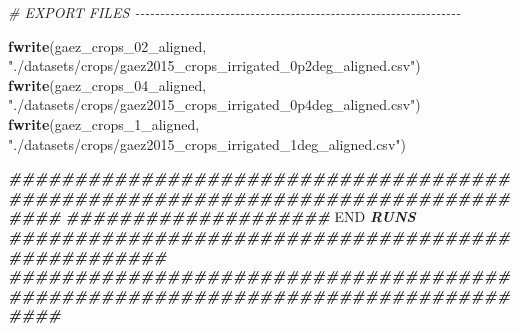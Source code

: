 \documentclass[
  11pt,
]{article}
\newenvironment{Shaded}{\begin{snugshade}}{\end{snugshade}}
\newcommand{\CommentTok}[1]{\textcolor[rgb]{0.56,0.35,0.01}{\textit{#1}}}
\newcommand{\DocumentationTok}[1]{\textcolor[rgb]{0.56,0.35,0.01}{\textbf{\textit{#1}}}}
\newcommand{\FunctionTok}[1]{\textcolor[rgb]{0.13,0.29,0.53}{\textbf{#1}}}
\newcommand{\NormalTok}[1]{#1}
\newcommand{\RegionMarkerTok}[1]{#1}
\newcommand{\StringTok}[1]{\textcolor[rgb]{0.31,0.60,0.02}{#1}}
\begin{document}
\begin{Shaded}
\begin{Highlighting}[]
\CommentTok{\# EXPORT FILES {-}{-}{-}{-}{-}{-}{-}{-}{-}{-}{-}{-}{-}{-}{-}{-}{-}{-}{-}{-}{-}{-}{-}{-}{-}{-}{-}{-}{-}{-}{-}{-}{-}{-}{-}{-}{-}{-}{-}{-}{-}{-}{-}{-}{-}{-}{-}{-}{-}{-}{-}{-}{-}{-}{-}{-}{-}{-}{-}{-}{-}{-}{-}{-}{-}}

\FunctionTok{fwrite}\NormalTok{(gaez\_crops\_02\_aligned, }\StringTok{"./datasets/crops/gaez2015\_crops\_irrigated\_0p2deg\_aligned.csv"}\NormalTok{)}
\FunctionTok{fwrite}\NormalTok{(gaez\_crops\_04\_aligned, }\StringTok{"./datasets/crops/gaez2015\_crops\_irrigated\_0p4deg\_aligned.csv"}\NormalTok{)}
\FunctionTok{fwrite}\NormalTok{(gaez\_crops\_1\_aligned,  }\StringTok{"./datasets/crops/gaez2015\_crops\_irrigated\_1deg\_aligned.csv"}\NormalTok{)}

\DocumentationTok{\#\#\#\#\#\#\#\#\#\#\#\#\#\#\#\#\#\#\#\#\#\#\#\#\#\#\#\#\#\#\#\#\#\#\#\#\#\#\#\#\#\#\#\#\#\#\#\#\#\#\#\#\#\#\#\#\#\#\#\#\#\#\#\#\#\#\#\#\#\#\#\#\#\#\#\#\#\#\#\#}
\DocumentationTok{\#\#\#\#\#\#\#\#\#\#\#\#\#\#\#\#\#\#\#\# }\RegionMarkerTok{END}\DocumentationTok{ RUNS \#\#\#\#\#\#\#\#\#\#\#\#\#\#\#\#\#\#\#\#\#\#\#\#\#\#\#\#\#\#\#\#\#\#\#\#\#\#\#\#\#\#\#\#\#\#\#\#\#\#}
\DocumentationTok{\#\#\#\#\#\#\#\#\#\#\#\#\#\#\#\#\#\#\#\#\#\#\#\#\#\#\#\#\#\#\#\#\#\#\#\#\#\#\#\#\#\#\#\#\#\#\#\#\#\#\#\#\#\#\#\#\#\#\#\#\#\#\#\#\#\#\#\#\#\#\#\#\#\#\#\#\#\#\#\#}
\end{Highlighting}
\end{Shaded}
\end{document}
